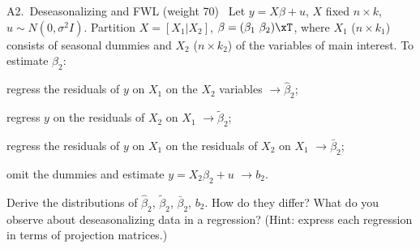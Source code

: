 \begin{qbox}{A2.\ Deseasonalizing and FWL \quad(weight 70)}{\must\ }
Let $y = X\beta + u$, $X$ fixed $n\times k$, $u\sim N(0,\sigma^{2}I)$. Partition $X = [X_{1}|X_{2}]$,
$\beta = (\beta_{1}\ \beta_{2})\xT$, where $X_{1}$ ($n\times k_{1}$) consists of seasonal dummies and
$X_{2}$ ($n\times k_{2}$) of the variables of main interest. To estimate $\beta_{2}$:
\begin{flatlist}
  \item[(i)] regress the residuals of $y$ on $X_{1}$ on the $X_{2}$ variables $\to\hat\beta_{2}$;
  \item[(ii)] regress $y$ on the residuals of $X_{2}$ on $X_{1}$ $\to\tilde\beta_{2}$;
  \item[(iii)] regress the residuals of $y$ on $X_{1}$ on the residuals of $X_{2}$ on $X_{1}$ $\to\bar\beta_{2}$;
  \item[(iv)] omit the dummies and estimate $y = X_{2}\beta_{2} + u$ $\to b_{2}$.
\end{flatlist}
Derive the distributions of $\hat\beta_{2}$, $\tilde\beta_{2}$, $\bar\beta_{2}$, $b_{2}$. How do they
differ? What do you observe about deseasonalizing data in a regression?
(Hint: express each regression in terms of projection matrices.)
\end{qbox}

